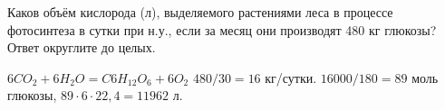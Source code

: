 
Каков
объём кислорода (л), выделяемого растениями леса в процессе фотосинтеза в сутки
при н.у., если за месяц они производят 480 кг глюкозы? Ответ округлите до
целых.

\solutionSection

$6CO_2+6H_2O=C6H_{12}O_6+6O_2$ $480/30 = 16$ кг/сутки. $16000/180=89$ моль глюкозы,  $89 \cdot 6 \cdot 22,4=11962$ л.

